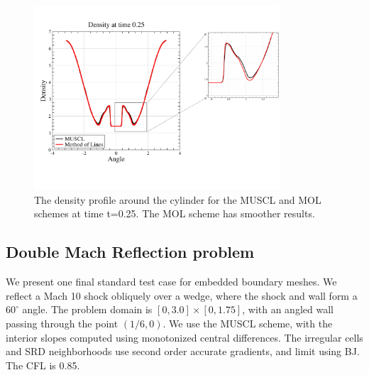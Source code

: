 \begin{figure}[h]
\centering
\hspace*{-.5in}
\includegraphics[height=2.7in]{figs/MM_densityBndry.pdf}
\hspace*{.3in}
\caption{\sf The density profile  around the cylinder for the MUSCL and MOL schemes 
at time t=0.25.  The MOL scheme has smoother results.}
\label{fig:cylbndry}
\end{figure}

\clearpage

\subsection{Double Mach Reflection problem}\label{sec:dm}
We present one final standard test case for embedded
boundary meshes. We reflect a Mach 10 shock obliquely over a wedge, 
where the shock and wall form a $60^{\circ}$ angle.  
The problem domain is $[0,3.0]\times[0,1.75]$, with an angled wall 
passing through the point $(1/6,0)$. 
We use the MUSCL scheme, with the interior slopes 
computed using monotonized central differences. The irregular cells and
SRD neighborhoods use second order accurate 
gradients, and limit using BJ.
The CFL is 0.85.


